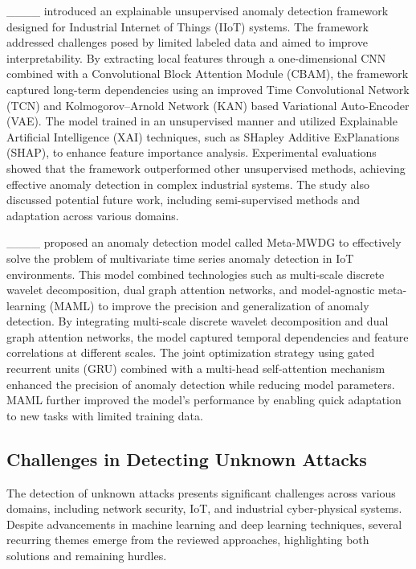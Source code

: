 ____ introduced an explainable unsupervised anomaly detection framework designed for Industrial Internet of Things (IIoT) systems. The framework addressed challenges posed by limited labeled data and aimed to improve interpretability. By extracting local features through a one-dimensional CNN combined with a Convolutional Block Attention Module (CBAM), the framework captured long-term dependencies using an improved Time Convolutional Network (TCN) and Kolmogorov–Arnold Network (KAN) based Variational Auto-Encoder (VAE). The model trained in an unsupervised manner and utilized Explainable Artificial Intelligence (XAI) techniques, such as SHapley Additive ExPlanations (SHAP), to enhance feature importance analysis. Experimental evaluations showed that the framework outperformed other unsupervised methods, achieving effective anomaly detection in complex industrial systems. The study also discussed potential future work, including semi-supervised methods and adaptation across various domains.

____ proposed an anomaly detection model called Meta-MWDG to effectively solve the problem of multivariate time series anomaly detection in IoT environments. This model combined technologies such as multi-scale discrete wavelet decomposition, dual graph attention networks, and model-agnostic meta-learning (MAML) to improve the precision and generalization of anomaly detection. By integrating multi-scale discrete wavelet decomposition and dual graph attention networks, the model captured temporal dependencies and feature correlations at different scales. The joint optimization strategy using gated recurrent units (GRU) combined with a multi-head self-attention mechanism enhanced the precision of anomaly detection while reducing model parameters. MAML further improved the model’s performance by enabling quick adaptation to new tasks with limited training data. 


\subsection{Challenges in Detecting Unknown Attacks}

The detection of unknown attacks presents significant challenges across various domains, including network security, IoT, and industrial cyber-physical systems. Despite advancements in machine learning and deep learning techniques, several recurring themes emerge from the reviewed approaches, highlighting both solutions and remaining hurdles.

